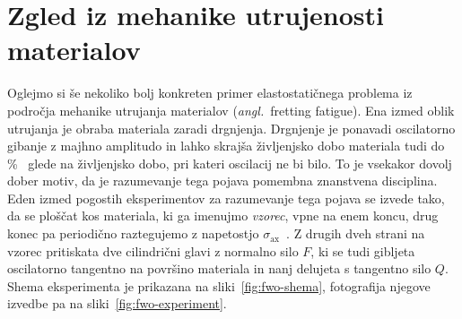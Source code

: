 \documentclass[12pt,a4paper,twoside]{article}
\theoremstyle{definition} %
\theoremstyle{plain} %
\numberwithin{equation}{section}
\newcommand{\sax}{\ensuremath{\sigma_{\text{ax}}}}
\newcommand{\ang}[1]{(\hspace{-1.5px}\textit{angl.}\ #1)}
\let\oldsection\section
\def\section{\cleardoublepage\oldsection}
\begin{document}
\section{Zgled iz mehanike utrujenosti materialov}
\label{sec:fwo}
Oglejmo si še nekoliko bolj konkreten primer elastostatičnega problema iz področja mehanike utrujanja
materialov \ang{fretting fatigue}. Ena izmed oblik utrujanja je obraba materiala zaradi drgnjenja.
Drgnjenje je ponavadi oscilatorno gibanje z majhno amplitudo in lahko skrajša življenjsko dobo materiala tudi
do \unit[50]{\%}~\cite{jeung2015crack} glede na življenjsko dobo, pri kateri oscilacij ne bi bilo.
To je vsekakor dovolj dober motiv, da je razumevanje tega pojava pomembna znanstvena disciplina.
Eden izmed pogostih eksperimentov za razumevanje tega pojava se izvede tako, da se ploščat kos
materiala, ki ga imenujmo \emph{vzorec}, vpne na enem koncu, drug konec pa periodično
raztegujemo z napetostjo $\sax$~\cite{hojjati2014prediction}. Z drugih dveh strani na vzorec
pritiskata dve cilindrični glavi z normalno silo $F$, ki se tudi gibljeta oscilatorno tangentno na
površino materiala in nanj delujeta s tangentno silo $Q$. Shema eksperimenta je prikazana na
sliki~\ref{fig:fwo-shema}, fotografija njegove izvedbe pa na sliki~\ref{fig:fwo-experiment}.
\end{document}
